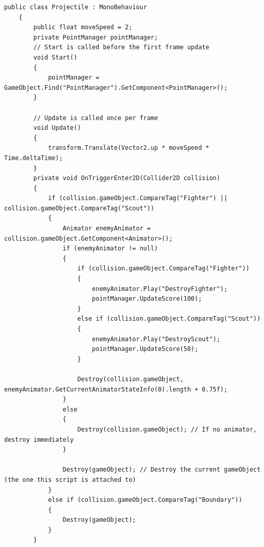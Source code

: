 \begin{lstlisting}[style=csharp]
    public class Projectile : MonoBehaviour
    {
        public float moveSpeed = 2;
        private PointManager pointManager;
        // Start is called before the first frame update
        void Start()
        {
            pointManager = GameObject.Find("PointManager").GetComponent<PointManager>();
        }
        
        // Update is called once per frame
        void Update()
        {
            transform.Translate(Vector2.up * moveSpeed * Time.deltaTime);
        }
        private void OnTriggerEnter2D(Collider2D collision)
        {
            if (collision.gameObject.CompareTag("Fighter") || collision.gameObject.CompareTag("Scout"))
            {
                Animator enemyAnimator = collision.gameObject.GetComponent<Animator>();
                if (enemyAnimator != null)
                {
                    if (collision.gameObject.CompareTag("Fighter"))
                    {
                        enemyAnimator.Play("DestroyFighter");
                        pointManager.UpdateScore(100);
                    }
                    else if (collision.gameObject.CompareTag("Scout"))
                    {
                        enemyAnimator.Play("DestroyScout");
                        pointManager.UpdateScore(50);
                    }
                    
                    Destroy(collision.gameObject, enemyAnimator.GetCurrentAnimatorStateInfo(0).length + 0.75f);
                }
                else
                {
                    Destroy(collision.gameObject); // If no animator, destroy immediately
                }
                
                Destroy(gameObject); // Destroy the current gameObject (the one this script is attached to)
            }
            else if (collision.gameObject.CompareTag("Boundary"))
            {
                Destroy(gameObject);
            }
        }
\end{lstlisting}
